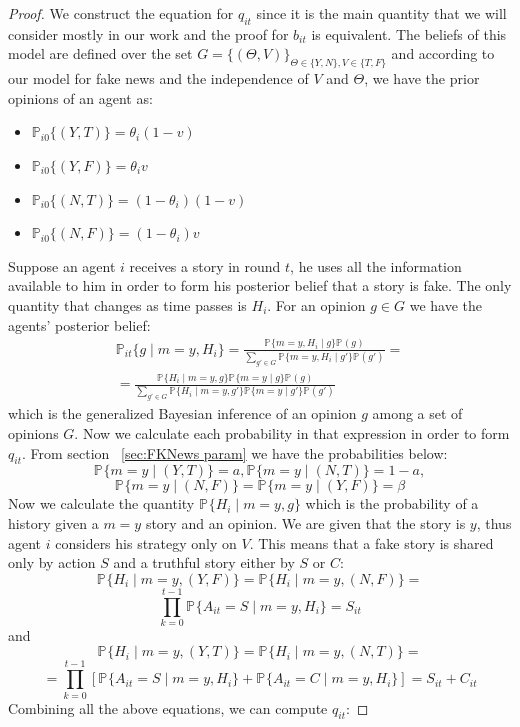 \begin{proof}
We construct the equation for $q_{it}$ since it is the main quantity that we will consider mostly in our work and the proof for $b_{it}$ is equivalent. 
The beliefs of this model are defined over the set $G =\{(\Theta , V )\}_{\Theta \in \{Y,N\},V \in \{T,F\}}$ and according to our model for fake news and the independence of $V$ and $\Theta$, we have the prior opinions of an agent as:
	\begin{itemize}
		\item $\mathbb{P}_{i0} \{(Y,T)\} = \theta_i (1-v) $
		\item $\mathbb{P}_{i0} \{(Y,F)\} = \theta_i v $
		\item $\mathbb{P}_{i0} \{(N,T)\} = (1-\theta_i) (1-v) $
		\item $\mathbb{P}_{i0} \{(N,F)\} = (1-\theta_i) v $
	\end{itemize}
Suppose an agent $i$ receives a story in round $t$, he uses all the information available to him in order to form his posterior belief that a story is fake. The only quantity that changes as time passes is $H_i$. For an opinion $g \in G$ we have the agents' posterior belief:
\begin{equation}
	\begin{split}
		\mathbb{P}_{it} \{g \mid m=y , H_i\} = \frac{\mathbb{P}_{} \{m=y , H_i \mid g\}\mathbb{P}_{} (g)}{\displaystyle\sum_{g' \in G}^{}\mathbb{P}_{} \{m=y , H_i \mid g'\}\mathbb{P}_{} (g')} = 
		\\ =\frac{\mathbb{P}_{} \{ H_i \mid m=y , g\} \mathbb{P}_{} \{ m=y \mid  g\} \mathbb{P}_{} (g)}{\displaystyle\sum_{g' \in G}^{}\mathbb{P}_{} \{ H_i \mid m=y , g'\} \mathbb{P}_{} \{ m=y \mid  g'\} \mathbb{P}_{} (g')}
	\end{split}
\end{equation}
which is the generalized Bayesian inference of an opinion $g$ among a set of opinions $G$. Now we calculate each probability in that expression in order to form $q_{it}$. From section ~\ref{sec:FKNews param} we have the probabilities below:
$$\mathbb{P}_{} \{ m=y \mid (Y,T)\} = a, \mathbb{P}_{} \{ m=y \mid (N,T)\} = 1-a,$$
$$ \mathbb{P}_{} \{ m=y \mid (N,F)\} = \mathbb{P}_{} \{ m=y \mid (Y,F)\} = \beta$$
Now we calculate the quantity $\mathbb{P}_{} \{ H_i \mid m=y , g\}$ which is the probability of a history given a $m=y$ story and an opinion. We are given that the story is $y$, thus agent $i$ considers his strategy only on $V$. This means that a fake story is shared only by action $S$ and a truthful story either by $S$ or $C$:
$$\mathbb{P}_{} \{ H_i \mid m=y , (Y,F)\} = \mathbb{P}_{} \{ H_i \mid m=y , (N,F)\} = $$ $$ \displaystyle\prod_{k=0}^{t-1}\mathbb{P}_{} \{ A_{it}=S \mid m=y , H_i\} =S_{it}$$ 
and
$$\mathbb{P}_{} \{ H_i \mid m=y , (Y,T)\} = \mathbb{P}_{} \{ H_i \mid m=y , (N,T)\} = $$ $$ =\displaystyle\prod_{k=0}^{t-1} [\mathbb{P}_{} \{ A_{it}=S \mid m=y , H_i\} + \mathbb{P}_{} \{ A_{it}=C \mid m=y , H_i\} ]= S_{it} +C_{it}$$
Combining all the above equations, we can compute $q_{it}$:


\end{proof}
